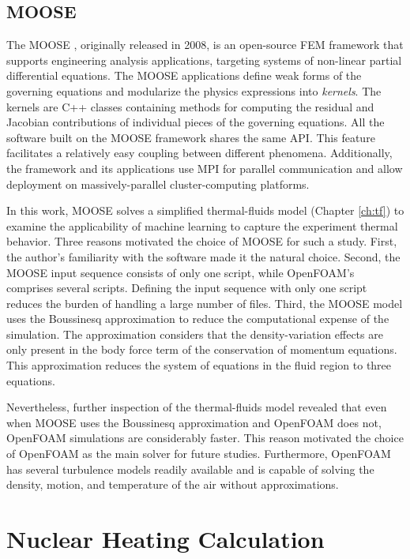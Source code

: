 \subsection{MOOSE}

The \gls*{MOOSE} \cite{gaston_moose_2009}, originally released in 2008, is an open-source \gls*{FEM} framework that supports engineering analysis applications, targeting systems of non-linear partial differential equations.
The MOOSE applications define weak forms of the governing equations and modularize the physics expressions into \textit{kernels}.
The kernels are C++ classes containing methods for computing the residual and Jacobian contributions of individual pieces of the governing equations.
All the software built on the MOOSE framework shares the same \gls*{API}.
This feature facilitates a relatively easy coupling between different phenomena.
Additionally, the framework and its applications use \gls*{MPI} for parallel communication and allow deployment on massively-parallel cluster-computing platforms.

In this work, MOOSE solves a simplified thermal-fluids model (Chapter \ref{ch:tf}) to examine the applicability of machine learning to capture the experiment thermal behavior.
Three reasons motivated the choice of MOOSE for such a study.
First, the author’s familiarity with the software made it the natural choice.
Second, the MOOSE input sequence consists of only one script, while OpenFOAM’s comprises several scripts.
Defining the input sequence with only one script reduces the burden of handling a large number of files.
Third, the MOOSE model uses the Boussinesq approximation to reduce the computational expense of the simulation.
The approximation considers that the density-variation effects are only present in the body force term of the conservation of momentum equations.
This approximation reduces the system of equations in the fluid region to three equations.

Nevertheless, further inspection of the thermal-fluids model revealed that even when MOOSE uses the Boussinesq approximation and OpenFOAM does not, OpenFOAM simulations are considerably faster.
This reason motivated the choice of OpenFOAM as the main solver for future studies.
Furthermore, OpenFOAM has several turbulence models readily available and is capable of solving the density, motion, and temperature of the air without approximations.


\section{Nuclear Heating Calculation}

